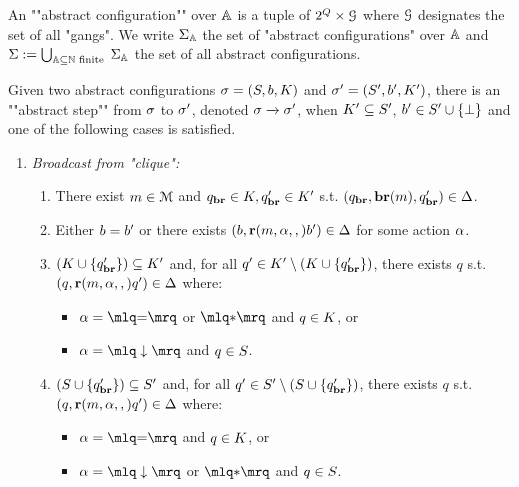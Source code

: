 \begin{definition}
\label{def:abstract-configuration}
An ""abstract configuration"" over $\mathbb{A}$ is a tuple of $2^Q \times \mathcal{G}$ where $\mathcal{G}$ designates the set of all "gangs". We write $\Sigma_{\mathbb{A}}$ the set of "abstract configurations" over $\mathbb{A}$ and $\Sigma := \bigcup_{\mathbb{A} \subseteq \mathbb{N} \text{ finite }}\Sigma_{\mathbb{A}}$ the set of all abstract configurations. 

Given two abstract configurations $\aconfig = (\covset, \boss, \clique)$ and $\aconfig' = (\covset', \boss', \clique')$, there is an ""abstract step"" from $\sigma$ to $\sigma'$, denoted $\sigma \xrightarrow{} \sigma'$, when $\clique' \subseteq \covset'$, $\boss' \in \covset' \cup \set{\noboss}$ and one of the following cases is satisfied.
\begin{enumerate}
\item \emph{Broadcast from "clique":}
	\begin{enumerate}[i]
		\item\label{item:broadcast_from_clique_broadcast} There exist $m \in \mathcal{M}$ and $\statebr \in \clique, \statebr' \in \clique'$ s.t. $(q_{\textbf{br}}, \textbf{br}(m), q_{\textbf{br}}') \in \Delta$. 
		
		\item\label{item:broadcast_from_clique_boss} Either $\boss = \boss'$ or there exists $(\boss, \rec{\amessage}{\anact}, \boss') \in \transitions$ for some action $\alpha$.

		\item\label{item:broadcast_from_clique_clique}$(\clique \cup \set{\statebr'}) \subseteq \clique'$ and, for all $q' \in \clique' \setminus (\clique \cup \set{\statebr'})$, there exists $q$ s.t. $(q, \textbf{r}(m, \alpha, ,) q') \in \Delta$ where:
		\begin{itemize}
			\item $\anact = \quotemarks{\eqtestact}$ or $\quotemarks{\dummyact}$ and $q \in \clique$, or
			\item $\anact= \quotemarks{\enregact}$ and $q \in S$.
		\end{itemize}
		
		\item\label{item:broadcast_from_clique_covset}$(S \cup \{q_{\textbf{br}}'\}) \subseteq S'$ and, for all $q' \in S' \setminus (S \cup \{q_{\textbf{br}}'\})$, there exists $q$ s.t. $(q, \textbf{r}(m, \alpha, ,) q') \in \Delta$ where:
		\begin{itemize}
			\item  $\anact = \quotemarks{\eqtestact}$ and $q \in \clique$, or
			\item $\anact = \quotemarks{\enregact}$ or $\quotemarks{\dummyact}$ and $q \in S$.
		\end{itemize}
	\end{enumerate}



\end{enumerate}
\end{definition}
